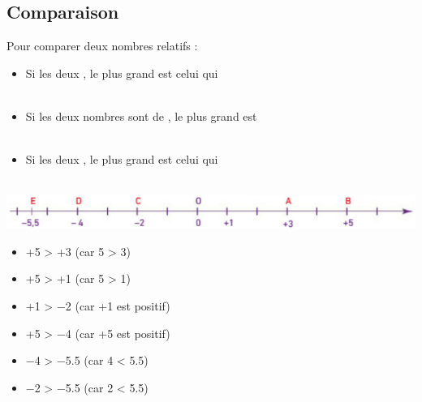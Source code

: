 \setcounter{subsection}{1}

\subsection{Comparaison}

\begin{myprops}
	Pour comparer deux nombres relatifs :
	\begin{itemize}
		\item Si les deux , le plus grand est celui qui \\ \ %
		\item Si les deux nombres sont de , le plus grand est \\ \ %
		\item Si les deux , le plus grand est celui qui \\ \ %
	\end{itemize}
\end{myprops}


\begin{myexs}
	\begin{center}
		\includegraphics[scale=0.5]{img/droite2}		
	\end{center}
	
	
	\begin{multicols}{2}
		\begin{itemize}
			\item +5 > +3 (car 5 > 3)
			\item +5 > +1 (car 5 > 1)
			\item +1 > \num{-2} (car +1 est positif)
			\item +5 > \num{-4} (car +5 est positif)
			\item \num{-4} > \num{-5.5} (car 4 < \num{5.5})
			\item \num{-2} > \num{-5.5} (car 2 < \num{5.5})
		\end{itemize}
	\end{multicols}
\end{myexs}